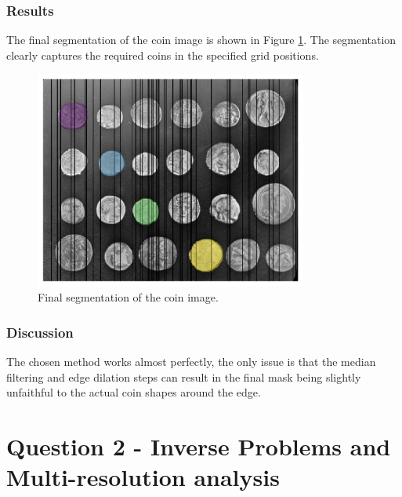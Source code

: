 \documentclass[11pt]{article}
\begin{document}
\subsubsection{Results}
The final segmentation of the coin image is shown in Figure \ref{fig:q1c_selected_coins}. The segmentation clearly captures the required coins in the specified grid positions.  

\begin{figure}[H]
    \centering
    \includegraphics[width=0.8\textwidth]{figs/q1c.png}
    \caption{Final segmentation of the coin image.}
    \label{fig:q1c_selected_coins}
\end{figure}

\subsubsection{Discussion}
The chosen method works almost perfectly, the only issue is that the median filtering and edge dilation steps can result in the final mask being slightly unfaithful to the actual coin shapes around the edge.
\section{Question 2 - Inverse Problems and Multi-resolution analysis}
\end{document}
